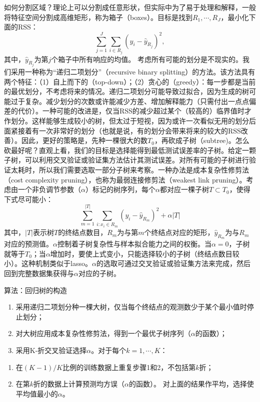 \documentclass[hyperref,]{ctexart}
\providecommand{\tightlist}{%
  \setlength{\itemsep}{0pt}\setlength{\parskip}{0pt}}
\begin{document}
如何分割区域？理论上可以分割成任意形状，但实际中为了易于处理和解释，一般将特征空间分割成高维矩形，称为箱子（boxes）。目标是找到\(R_1,\cdots,R_J\)，最小化下面的RSS：
\[\sum_{j=1}^J \sum_{i\in R_j} \left(y_i-\hat{y}_{R_j}\right)^2,\]
其中，\(\hat{y}_{R_j}\)为第\(j\)个箱子中所有响应的均值。
考虑所有可能的划分是不现实的。我们采用一种称为``递归二项划分''（recursive
binary
splitting）的方法。该方法具有两个特征：（1）自上而下的（top-down）；（2）贪心的（greedy）：每一步都是当前的最优划分，不考虑将来的情况。递归二项划分可能导致过拟合，因为生成的树可能过于复杂。减少划分的次数或许能减少方差、增加解释能力（只需付出一点点偏差的代价）。一种可能的改进是，仅当RSS的减少超过某个（较高的）临界值时才作划分。这样能够生成较小的树，但太过于短视，因为或许一次看似无用的划分后面紧接着有一次非常好的划分（也就是说，有的划分会带来将来的较大的RSS改善）。因此，更好的策略是，先种一棵很大的数\(T_0\)，再砍成子树（subtree)。怎么砍最好呢？直观上看，我们的目标是选择能得到最低测试误差率的子树。给定一颗子树，可以利用交叉验证或验证集方法估计其测试误差。对所有可能的子树进行验证太耗时，所以我们需要选取一部分子树来考察。一种办法是成本复杂性修剪法（cost
complexity pruning），也称为最弱连接修剪法（weakest link
pruning）。考虑由一个非负调节参数（\(\alpha\)）标记的树序列，每个\(\alpha\)都对应一棵子树\(T\subset T_0\)，使得下式尽可能小：
\[\sum_{m=1}^{|T|} \sum_{i:x_i\in R_m} \left(y_i-\hat{y}_{R_m}\right)^2 + \alpha|T|\]
其中，\(|T|\)表示树\(T\)的终结点数目，\(R_m\)为与第\(m\)个终结点对应的矩形，\(\hat{y}_{R_m}\)为与\(R_m\)对应的预测值。\(\alpha\)控制着子树复杂性与样本拟合能力之间的权衡。当\(\alpha=0\)，子树就等于\(T_0\)；当\(\alpha\)增加时，要使上式变小，只能选择较小的子树（终结点数目较小）。这种机制类似于lasso。\(\alpha\)的选取可通过交叉验证或验证集方法来完成，然后回到完整数据集获得与\(\alpha\)对应的子树。

算法：回归树的构造

\begin{enumerate}
\def\labelenumi{\arabic{enumi}.}
\tightlist
\item
  采用递归二项划分种一棵大树，仅当每个终结点的观测数少于某个最小值时停止划分；
\item
  对大树应用成本复杂性修剪法，得到一个最优子树序列（\(\alpha\)的函数）；
\item
  采用K-折交叉验证选择\(\alpha\)。对于每个\(k=1,\cdots,K\)：
\end{enumerate}

\begin{enumerate}
\def\labelenumi{(\alph{enumi})}
\tightlist
\item
  在\((K-1)/K\)比例的训练数据上重复步骤1和2，不包括第\(k\)折；
\item
  在第\(k\)折的数据上计算预测均方误（\(\alpha\)的函数）。
  对上面的结果作平均，选择使平均值最小的\(\alpha\)。
\end{enumerate}
\end{document}
